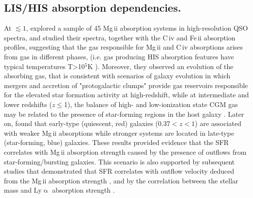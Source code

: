 \documentclass[longauth]{aa}
\begin{document}
\subsection{LIS/HIS absorption dependencies.}

At $\lesssim1$, \cite{Churchill00b} explored a sample of 45 Mg\,{\sc ii}
absorption systems in high-resolution QSO spectra, and studied their spectra,
together with the C\,{\sc iv} and Fe\,{\sc ii} absorption profiles,
suggesting that the gas responsible for Mg\,{\sc ii} and C\,{\sc iv}
absorptions arises from gas in different phases, (i.e. gas producing HIS
absorption features have typical temperatures T>10$^{5}$K \citealt
{Tumlinson17}). Moreover, they observed an evolution of the absorbing gas,
that is consistent with scenarios of galaxy evolution in which mergers and
accretion of "protogalactic clumps" provide gas reservoirs responsible for
the elevated star formation activity at high-redshift, while at intermediate
and lower redshifts ($z\leq$1), the balance of high- and low-ionization state
CGM gas may be related to the presence of star-forming regions in the host
galaxy \citep{Churchill00b}. Later on, \cite{Zibetti07} found that
early-type (quiescent, red) galaxies ($0.37 < z < 1$) are associated with
weaker  Mg\,{\sc ii} absorptions while stronger systems are located in
late-type (star-forming, blue) galaxies. These results provided evidence that
the SFR correlates with Mg\,{\sc ii} absorption strength caused by the
presence of outflows from star-forming/bursting galaxies.  This scenario is
also supported by subsequent studies that demonstrated that SFR correlates
with outflow velocity deduced from the Mg\,{\sc ii} absorption strength 
\citep{Weiner09, Martin12,Tremonti07,Rubin10}, and by the correlation between
the stellar mass and Ly$\upalpha$ absorption strength \citep
{Bordoloi18,Wide21}.
\end{document}
